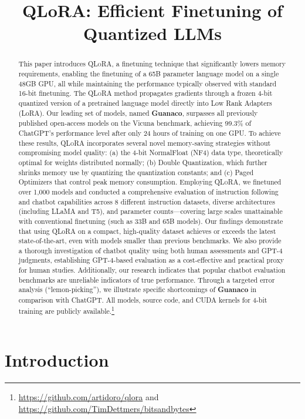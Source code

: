 \title{QLoRA: Efficient Finetuning of Quantized LLMs}

\begin{abstract}
This paper introduces \textsc{QLoRA}, a finetuning technique that significantly lowers memory requirements, enabling the finetuning of a 65B parameter language model on a single 48GB GPU, all while maintaining the performance typically observed with standard 16-bit finetuning. The \textsc{QLoRA} method propagates gradients through a frozen 4-bit quantized version of a pretrained language model directly into Low Rank Adapters (LoRA). Our leading set of models, named \textbf{Guanaco}, surpasses all previously published open-access models on the Vicuna benchmark, achieving 99.3\% of ChatGPT’s performance level after only 24 hours of training on one GPU. To achieve these results, \textsc{QLoRA} incorporates several novel memory-saving strategies without compromising model quality: (a) the 4-bit NormalFloat (NF4) data type, theoretically optimal for weights distributed normally; (b) Double Quantization, which further shrinks memory use by quantizing the quantization constants; and (c) Paged Optimizers that control peak memory consumption. Employing \textsc{QLoRA}, we finetuned over 1,000 models and conducted a comprehensive evaluation of instruction following and chatbot capabilities across 8 different instruction datasets, diverse architectures (including LLaMA and T5), and parameter counts—covering large scales unattainable with conventional finetuning (such as 33B and 65B models). Our findings demonstrate that using QLoRA on a compact, high-quality dataset achieves or exceeds the latest state-of-the-art, even with models smaller than previous benchmarks. We also provide a thorough investigation of chatbot quality using both human assessments and GPT-4 judgments, establishing GPT-4-based evaluation as a cost-effective and practical proxy for human studies. Additionally, our research indicates that popular chatbot evaluation benchmarks are unreliable indicators of true performance. Through a targeted error analysis (“lemon-picking”), we illustrate specific shortcomings of \textbf{Guanaco} in comparison with ChatGPT. All models, source code, and CUDA kernels for 4-bit training are publicly available.\footnote{\url{https://github.com/artidoro/qlora} and \url{https://github.com/TimDettmers/bitsandbytes}}
\end{abstract}

\section{Introduction}

